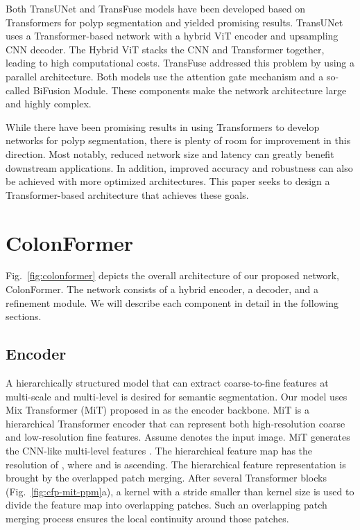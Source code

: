 \documentclass{article}
\newcommand{\ModelName}{ColonFormer}
\begin{document}
Both TransUNet \cite{transunet} and TransFuse \cite{transfuse} models have been developed based on Transformers for polyp segmentation and yielded promising results. TransUNet uses a Transformer-based network with a hybrid ViT encoder and upsampling CNN decoder. The Hybrid ViT stacks the CNN and Transformer together, leading to high computational costs. TransFuse addressed this problem by using a parallel architecture. Both models use the attention gate mechanism \cite{unetag} and a so-called BiFusion Module. These components make the network architecture large and highly complex.

While there have been promising results in using Transformers to develop networks for polyp segmentation, there is plenty of room for improvement in this direction. Most notably, reduced network size and latency can greatly benefit downstream applications. In addition, improved accuracy and robustness can also be achieved with more optimized architectures. This paper seeks to design a Transformer-based architecture that achieves these goals. 

\section{\ModelName}
\label{sec:propose}
Fig.~\ref{fig:colonformer} depicts the overall architecture of our proposed network, \ModelName. The network consists of a hybrid encoder, a decoder, and a refinement module. We will describe each component in detail in the following sections.

\subsection{Encoder}


A hierarchically structured model that can extract coarse-to-fine features at multi-scale and multi-level is desired for semantic segmentation. Our model uses Mix Transformer (MiT) proposed in \cite{segformer} as the encoder backbone. MiT is a hierarchical Transformer encoder that can represent both high-resolution coarse and low-resolution fine features. Assume  denotes the input image. MiT generates the CNN-like multi-level features . The hierarchical feature map  has the resolution of , where  and  is ascending. The hierarchical feature representation is brought by the overlapped patch merging. After several Transformer blocks (Fig.~\ref{fig:cfp-mit-ppm}a), a kernel with a stride smaller than kernel size is used to divide the feature map into overlapping patches. Such an overlapping patch merging process ensures the local continuity around those patches.  
\end{document}
